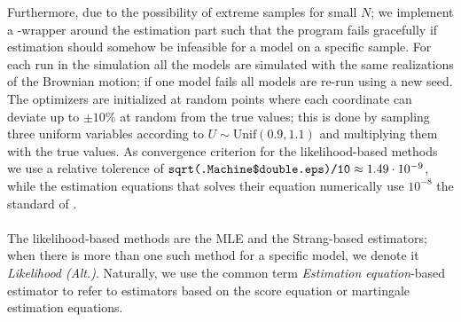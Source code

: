 Furthermore, due to the possibility of extreme samples for small $N$; we implement a -wrapper around the estimation part such that the program fails gracefully if estimation should somehow be infeasible for a model on a specific sample. For each run in the simulation all the models are simulated with the same realizations of the Brownian motion; if one model fails all models are re-run using a new seed. The optimizers are initialized at random points where each coordinate can deviate up to $\pm 10\%$ at random from the true values; this is done by sampling three uniform variables according to $U\sim\mathrm{Unif}(0.9, 1.1)$ and multiplying them with the true values. As convergence criterion for the likelihood-based methods we use a relative tolerence of $\texttt{sqrt(.Machine\$double.eps)/10}\approx 1.49\cdot 10^{-9}$, while the estimation equations that solves their equation numerically use $10^{-8}$ the standard of . \\\\
The likelihood-based methods are the MLE and the Strang-based estimators; when there is more than one such method for a specific model, we denote it \textit{Likelihood (Alt.)}. Naturally, we use the common term \textit{Estimation equation}-based estimator to refer to estimators based on the score equation or martingale estimation equations.
